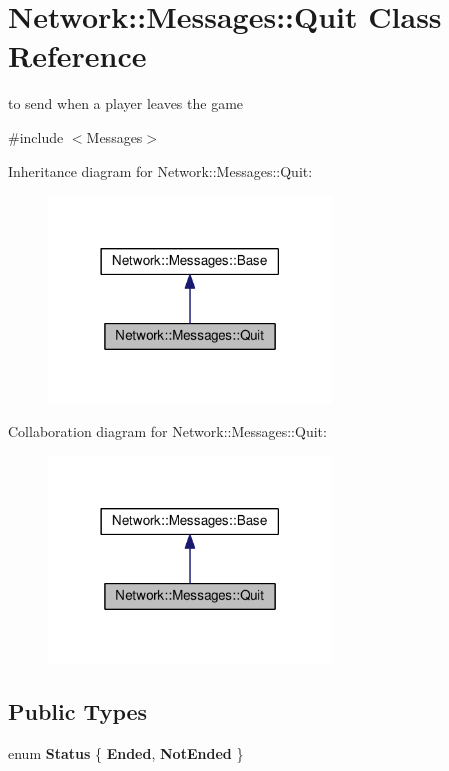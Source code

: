 \hypertarget{class_network_1_1_messages_1_1_quit}{}\section{Network\+:\+:Messages\+:\+:Quit Class Reference}
\label{class_network_1_1_messages_1_1_quit}


to send when a player leaves the game  




{\ttfamily \#include $<$Messages$>$}



Inheritance diagram for Network\+:\+:Messages\+:\+:Quit\+:
\nopagebreak
\begin{figure}[H]
\begin{center}
\leavevmode
\includegraphics[width=213pt]{class_network_1_1_messages_1_1_quit__inherit__graph}
\end{center}
\end{figure}


Collaboration diagram for Network\+:\+:Messages\+:\+:Quit\+:
\nopagebreak
\begin{figure}[H]
\begin{center}
\leavevmode
\includegraphics[width=213pt]{class_network_1_1_messages_1_1_quit__coll__graph}
\end{center}
\end{figure}
\subsection*{Public Types}
\begin{DoxyCompactItemize}
\item 
\mbox{\label{class_network_1_1_messages_1_1_quit_a1f3381afcf9b71eb6060b04f9d1855ef}} 
enum {\bfseries Status} \{ {\bfseries Ended}, 
{\bfseries Not\+Ended}
 \}
\end{DoxyCompactItemize}
